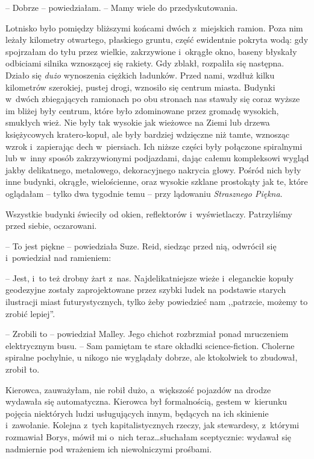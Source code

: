 \documentclass[oneside,polish,11pt,sfheadings]{mwbk}
\begin{document}
-- Dobrze -- powiedziałam. -- Mamy wiele do przedyskutowania.

Lotnisko było pomiędzy bliższymi końcami dwóch z~miejskich ramion. Poza
nim leżały kilometry otwartego, płaskiego gruntu, część ewidentnie
pokryta wodą: gdy spojrzałam do tyłu przez wielkie, zakrzywione i~okrągłe okno, baseny błyskały odbiciami silnika wznoszącej się rakiety.
Gdy zblakł, rozpaliła się następna. Działo się \textit{dużo }wynoszenia
ciężkich ładunków. Przed nami, wzdłuż kilku kilometrów szerokiej, pustej
drogi, wznosiło się centrum miasta. Budynki w~dwóch zbiegających
ramionach po obu stronach nas stawały się coraz wyższe im bliżej były
centrum, które było zdominowane przez gromadę wysokich, smukłych wież.
Nie były tak wysokie jak wieżowce na Ziemi lub drzewa księżycowych
kratero-kopuł, ale były bardziej wdzięczne niż tamte, wznosząc wzrok i~zapierając dech w~piersiach. Ich niższe części były połączone spiralnymi
lub w~inny sposób zakrzywionymi podjazdami, dając całemu kompleksowi
wygląd jakby delikatnego, metalowego, dekoracyjnego nakrycia głowy.
Pośród nich były inne budynki, okrągłe, wielościenne, oraz wysokie
szklane prostokąty jak te, które oglądałam -- tylko dwa tygodnie temu -- przy lądowaniu \textit{Strasznego Piękna}.

Wszystkie budynki świeciły od okien, reflektorów i~wyświetlaczy.
Patrzyliśmy przed siebie, oczarowani.

-- To jest piękne -- powiedziała Suze. Reid, siedząc przed nią, odwrócił
się i~powiedział nad ramieniem:

-- Jest, i~to też drobny żart z~nas. Najdelikatniejsze wieże i~eleganckie
kopuły geodezyjne zostały zaprojektowane przez szybki ludek na podstawie
starych ilustracji miast futurystycznych, tylko żeby powiedzieć nam
,,patrzcie, możemy to zrobić lepiej''.

-- Zrobili to -- powiedział Malley. Jego chichot rozbrzmiał ponad
mruczeniem elektrycznym busu. -- Sam pamiętam te stare okładki
science-fiction. Cholerne spiralne pochylnie, u nikogo nie wyglądały
dobrze, ale ktokolwiek to zbudował, zrobił to.

Kierowca, zauważyłam, nie robił dużo, a~większość pojazdów na drodze
wydawała się automatyczna. Kierowca był formalnością, gestem w~kierunku
pojęcia niektórych ludzi usługujących innym, będących na ich skinienie i~zawołanie. Kolejna z~tych kapitalistycznych rzeczy, jak stewardesy, z~którymi rozmawiał Borys, mówił mi o~nich teraz\ldots  słuchałam sceptycznie:
wydawał się nadmiernie pod wrażeniem ich niewolniczymi prośbami.
\end{document}
